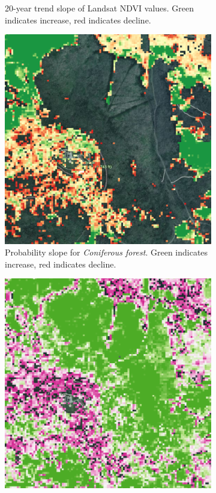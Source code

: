 \begin{figure}[H]
\begin{subfigure}[t]{0.24\textwidth}
        \caption{20-year trend slope of Landsat NDVI values. Green indicates increase, red indicates decline.}
        \label{fig:brocken_ndvi}
        \end{subfigure}
        \hfill
        \begin{subfigure}[t]{0.24\textwidth}
        \centering
        \includegraphics[width=\linewidth,height=\linewidth]{figs_06/brocken_pslope.png}
        \caption{Probability slope for \textit{Coniferous forest}. Green indicates increase, red indicates decline.}
        \label{fig:brocken_pslope}
        \end{subfigure}
        \hfill
        \begin{subfigure}[t]{0.24\textwidth}
        \centering
        \includegraphics[width=\linewidth,height=\linewidth]{figs_06/brocken_pslope_r2.png}

\end{subfigure}
\end{figure}
